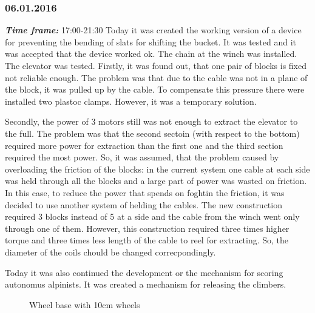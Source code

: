\subsubsection{06.01.2016}
\textit{\textbf{Time frame:}} 17:00-21:30 \newline
Today it was created the working version of a device for preventing the bending of slats for shifting the bucket. It was tested and it was accepted that the device worked ok.
The chain at the winch was installed.
The elevator was tested. Firstly, it was found out, that one pair of blocks is fixed not reliable enough. The problem was that due to the cable was not in a plane of the block, it was pulled up by the cable. To compensate this pressure there were installed two plastoc clamps. However, it was a temporary solution.

Secondly, the power of 3 motors still was not enough to extract the elevator to the full. The problem was that the second sectoin (with respect to the bottom) required more power for extraction than the first one and the third section required the most power. So, it was assumed, that the problem caused by overloading the friction of the blocks: in the current system one cable at each side was held through all the blocks and a large part of power was wasted on friction. In this case, to reduce the power that spends on foghtin the friction, it was decided to use another system of helding the cables. The new construction required 3 blocks instead of 5 at a side and the cable from the winch went only through one of them. However, this construction required three times higher torque and three times less length of the cable to reel for extracting. So, the diameter of the coils chould be changed correcpondingly.

Today it was also continued the development or the mechanism for scoring autonomus alpinists. It was created a mechanism for releasing the climbers.

\begin{figure}[H]
	\begin{minipage}[h]{1\linewidth}
		\caption{Wheel base with 10cm wheels}
		\label{wheeel_base_10cm_wheels}
	\end{minipage}
\end{figure}


